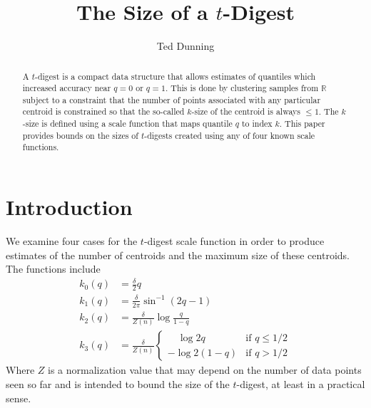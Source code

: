 \documentclass[11pt]{amsart}
\title{The Size of a $t$-Digest}
\author{Ted Dunning}
\date{}                                           %
\begin{document}
\begin{abstract}
A $t$-digest is a compact data structure that allows estimates of quantiles which increased accuracy near $q = 0$ or $q=1$. This is done by clustering samples from $\mathbb R$ subject to a constraint that the number of points associated with any particular centroid is constrained so that the so-called $k$-size of the centroid is always $\le 1$. The $k$-size is defined using a scale function that maps quantile $q$ to index $k$. This paper provides bounds on the sizes of $t$-digests created using any of four known scale functions.
\end{abstract}
\maketitle
\section{Introduction}
We examine four cases for the $t$-digest \citep{t-digest-arxiv} scale function in order to produce estimates of the number of centroids and the maximum size of these centroids. The functions include
\[
\begin{aligned}
k_0(q) &= \frac \delta 2 q \\
k_1(q) &= \frac \delta {2\pi}  \sin^{-1}(2q-1)   \\
k_2(q) &= \frac \delta {Z(n)} \log {\frac q {1-q}} \\
k_3(q) &= \frac \delta {Z(n)}\begin{cases}
\quad \log 2q & \text{if  } q \le 1/2 \\
- \log 2(1-q) & \text{if  } q > 1/2
\end{cases}
\end{aligned}
\]
Where $Z$ is a normalization value that may depend on the number of data points seen so far and is intended to bound the size of the $t$-digest, at least in a practical sense.
\end{document}
